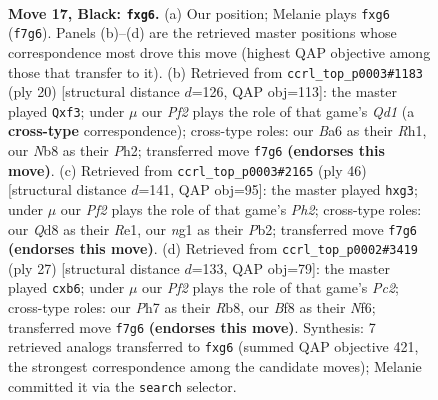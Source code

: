 \documentclass[11pt]{article}
\begin{document}
\begin{figure}[p]
\label{fig:thought-m31}
\end{figure}

\clearpage

\begin{figure}[p]\centering
\begin{subfigure}{0.46\textwidth}\centering
\resizebox{\linewidth}{!}{%
\newchessgame
\chessboard[
  setfen={rn1qkb1r/p4p1p/b1p1p1P1/2PpP1P1/PP3P2/2P5/3N4/R1BQK1NR b KQq - 0 17},
  showmover=false,
  pgfstyle=straightmove, color=movearrow, markmove={f7-g6}
]}
\caption{}
\end{subfigure}\hfill
\begin{subfigure}{0.46\textwidth}\centering
\resizebox{\linewidth}{!}{%
\newchessgame
\chessboard[
  setfen={rn1qk1nr/p1p2ppp/1p2b3/4p3/3P4/P1P1BpN1/2P3PP/1R1QKB1R w Kkq - 2 11},
  showmover=false,
  pgfstyle=straightmove, color=movearrow, markmove={d1-f3}
]}
\caption{}
\end{subfigure}
\\[4pt]
\begin{subfigure}{0.46\textwidth}\centering
\resizebox{\linewidth}{!}{%
\newchessgame
\chessboard[
  setfen={1r2brk1/2q3p1/2ppp2p/p2n4/P2P4/Q4Bp1/1PRBPP1P/4R1K1 w - - 0 24},
  showmover=false,
  pgfstyle=straightmove, color=movearrow, markmove={h2-g3}
]}
\caption{}
\end{subfigure}\hfill
\begin{subfigure}{0.46\textwidth}\centering
\resizebox{\linewidth}{!}{%
\newchessgame
\chessboard[
  setfen={rr4k1/2pq1pbp/pPbp1np1/4p3/1PP1P3/3P1N1P/5PP1/RNBQR1K1 b - - 0 14},
  showmover=false,
  pgfstyle=straightmove, color=movearrow, markmove={c7-b6}
]}
\caption{}
\end{subfigure}
\caption{\textbf{Move 17, Black: \texttt{fxg6}.} (a) Our position; Melanie plays \texttt{fxg6} (\texttt{f7g6}). Panels (b)--(d) are the retrieved master positions whose correspondence most drove this move (highest QAP objective among those that transfer to it). (b) Retrieved from \texttt{ccrl\_top\_p0003\#1183} (ply 20) [structural distance $d$=126, QAP obj=113]: the master played \texttt{Qxf3}; under $\mu$ our \emph{Pf2} plays the role of that game's \emph{Qd1} (a \textbf{cross-type} correspondence); cross-type roles: our \emph{B}a6 as their \emph{R}h1, our \emph{N}b8 as their \emph{P}h2; transferred move \texttt{f7g6} \textbf{(endorses this move)}. (c) Retrieved from \texttt{ccrl\_top\_p0003\#2165} (ply 46) [structural distance $d$=141, QAP obj=95]: the master played \texttt{hxg3}; under $\mu$ our \emph{Pf2} plays the role of that game's \emph{Ph2}; cross-type roles: our \emph{Q}d8 as their \emph{R}e1, our \emph{n}g1 as their \emph{P}b2; transferred move \texttt{f7g6} \textbf{(endorses this move)}. (d) Retrieved from \texttt{ccrl\_top\_p0002\#3419} (ply 27) [structural distance $d$=133, QAP obj=79]: the master played \texttt{cxb6}; under $\mu$ our \emph{Pf2} plays the role of that game's \emph{Pc2}; cross-type roles: our \emph{P}h7 as their \emph{R}b8, our \emph{B}f8 as their \emph{N}f6; transferred move \texttt{f7g6} \textbf{(endorses this move)}. Synthesis: 7 retrieved analogs transferred to \texttt{fxg6} (summed QAP objective 421, the strongest correspondence among the candidate moves); Melanie committed it via the \texttt{search} selector.}

\end{figure}
\end{document}
